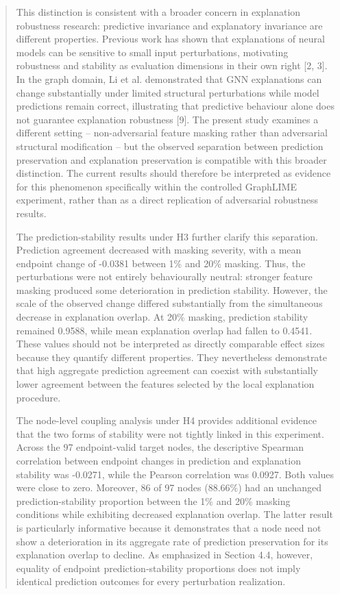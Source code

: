 \documentclass[a4paper]{article}
\begin{document}
\begin{quote}
This distinction is consistent with a broader concern in explanation
robustness research: predictive invariance and explanatory invariance
are different properties. Previous work has shown that explanations of
neural models can be sensitive to small input perturbations, motivating
robustness and stability as evaluation dimensions in their own right
{[}2, 3{]}. In the graph domain, Li et al. demonstrated that GNN
explanations can change substantially under limited structural
perturbations while model predictions remain correct, illustrating that
predictive behaviour alone does not guarantee explanation robustness
{[}9{]}. The present study examines a different setting --
non-adversarial feature masking rather than adversarial structural
modification -- but the observed separation between prediction
preservation and explanation preservation is compatible with this
broader distinction. The current results should therefore be interpreted
as evidence for this phenomenon specifically within the controlled
GraphLIME experiment, rather than as a direct replication of adversarial
robustness results.

The prediction-stability results under H3 further clarify this
separation. Prediction agreement decreased with masking severity, with a
mean endpoint change of -0.0381 between 1\% and 20\% masking. Thus, the
perturbations were not entirely behaviourally neutral: stronger feature
masking produced some deterioration in prediction stability. However,
the scale of the observed change differed substantially from the
simultaneous decrease in explanation overlap. At 20\% masking,
prediction stability remained 0.9588, while mean explanation overlap had
fallen to 0.4541. These values should not be interpreted as directly
comparable effect sizes because they quantify different properties. They
nevertheless demonstrate that high aggregate prediction agreement can
coexist with substantially lower agreement between the features selected
by the local explanation procedure.

The node-level coupling analysis under H4 provides additional evidence
that the two forms of stability were not tightly linked in this
experiment. Across the 97 endpoint-valid target nodes, the descriptive
Spearman correlation between endpoint changes in prediction and
explanation stability was -0.0271, while the Pearson correlation was
0.0927. Both values were close to zero. Moreover, 86 of 97 nodes
(88.66\%) had an unchanged prediction-stability proportion between the
1\% and 20\% masking conditions while exhibiting decreased explanation
overlap. The latter result is particularly informative because it
demonstrates that a node need not show a deterioration in its aggregate
rate of prediction preservation for its explanation overlap to decline.
As emphasized in Section 4.4, however, equality of endpoint
prediction-stability proportions does not imply identical prediction
outcomes for every perturbation realization.


\end{quote}
\end{document}
